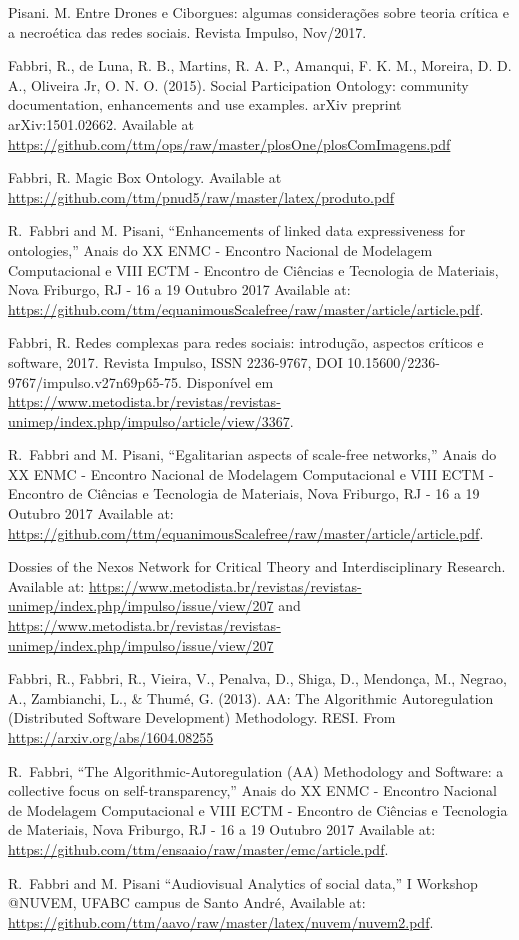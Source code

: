 \documentclass[letterpaper,10pt]{article}
\begin{document}
\begin{thebibliography}{99}
	Pisani. M.
	Entre Drones e Ciborgues: algumas considerações sobre teoria crítica e a necroética das redes sociais. Revista Impulso, Nov/2017.

	Fabbri, R., de Luna, R. B., Martins, R. A. P., Amanqui, F. K. M., Moreira, D. D. A., Oliveira Jr, O. N. O. (2015). Social Participation Ontology: community documentation, enhancements and use examples. arXiv preprint arXiv:1501.02662. Available at \url{https://github.com/ttm/ops/raw/master/plosOne/plosComImagens.pdf}

	Fabbri, R. Magic Box Ontology.
		Available at \url{https://github.com/ttm/pnud5/raw/master/latex/produto.pdf}

  R.~Fabbri and M. Pisani,
  ``Enhancements of linked data expressiveness for ontologies,''
  Anais do XX ENMC - Encontro Nacional de Modelagem Computacional e
  VIII ECTM - Encontro de Ci\^encias e Tecnologia de Materiais, Nova Friburgo,
  RJ - 16 a 19 Outubro 2017
		Available at: \url{https://github.com/ttm/equanimousScalefree/raw/master/article/article.pdf}.

	Fabbri, R. Redes complexas para redes sociais: introdução, aspectos críticos e software, 2017.
		Revista Impulso,
		ISSN 2236-9767,
		DOI 10.15600/2236-9767/impulso.v27n69p65-75.
		Disponível em
		\url{https://www.metodista.br/revistas/revistas-unimep/index.php/impulso/article/view/3367}.

  R.~Fabbri and M. Pisani,
  ``Egalitarian aspects of scale-free networks,''
  Anais do XX ENMC - Encontro Nacional de Modelagem Computacional e
  VIII ECTM - Encontro de Ci\^encias e Tecnologia de Materiais, Nova Friburgo,
  RJ - 16 a 19 Outubro 2017
		Available at: \url{https://github.com/ttm/equanimousScalefree/raw/master/article/article.pdf}.

	Dossies of the Nexos Network for Critical Theory and Interdisciplinary Research. Available at: \url{https://www.metodista.br/revistas/revistas-unimep/index.php/impulso/issue/view/207} and \url{https://www.metodista.br/revistas/revistas-unimep/index.php/impulso/issue/view/207}

	Fabbri, R., Fabbri, R., Vieira, V., Penalva, D., Shiga, D., Mendonça, M., Negrao, A., Zambianchi, L., \& Thumé, G. (2013). AA: The Algorithmic Autoregulation (Distributed Software Development) Methodology. RESI. From \url{https://arxiv.org/abs/1604.08255}

  R.~Fabbri,
  ``The Algorithmic-Autoregulation (AA) Methodology and Software: a collective focus on self-transparency,''
  Anais do XX ENMC - Encontro Nacional de Modelagem Computacional e
  VIII ECTM - Encontro de Ci\^encias e Tecnologia de Materiais, Nova Friburgo,
  RJ - 16 a 19 Outubro 2017
		Available at: \url{https://github.com/ttm/ensaaio/raw/master/emc/article.pdf}.

  R.~Fabbri and M. Pisani
  ``Audiovisual Analytics of social data,''
  I Workshop @NUVEM, UFABC campus de Santo André,
		Available at: \url{https://github.com/ttm/aavo/raw/master/latex/nuvem/nuvem2.pdf}.
\end{thebibliography}
\end{document}
